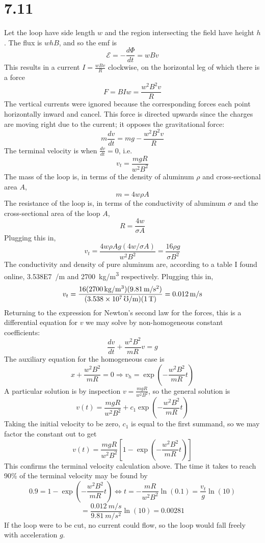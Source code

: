 \documentclass{article}
\begin{document}
\section*{7.11}
Let the loop have side length $w$ and the region intersecting the field have height $h$. The flux is $whB$, and so the emf is
\[\mathcal{E}=-\frac{d\Phi}{dt}=wBv \]
This results in a current $I=\frac{wBv}{R}$ clockwise, on the horizontal leg of which there is a force
\[F=BIw=\frac{w^2B^2v}{R} \]
The vertical currents were ignored because the corresponding forces each point horizontally inward and cancel.
This force is directed upwards since the charges are moving right due to the current; it opposes the gravitational force:
\[m\frac{dv}{dt}=mg-\frac{w^2B^2v}{R}\]
The terminal velocity is when $\frac{dv}{dt}=0$, i.e.
\[v_t=\frac{mgR}{w^2B^2}\]
The mass of the loop is, in terms of the density of aluminum $\rho$ and cross-sectional area $A$,
\[m=4w\rho A\]
The resistance of the loop is, in terms of the conductivity of aluminum $\sigma$ and the cross-sectional area of the loop $A$,
\[R=\frac{4w}{\sigma A}\]
Plugging this in,
\[v_t=\frac{4w\rho Ag\left( 4w/\sigma A \right)}{w^2B^2}=\frac{16\rho g}{\sigma B^2}\]
The conductivity and density of pure aluminum are, according to a table I found online, \SI{3.538E7}{\mho/m} and \SI{2700}{kg/m^3} respectively. Plugging this in,
\[v_t=\frac{16(\SI{2700}{kg/m^3})(\SI{9.81}{m/s^2})}{(\SI{3.538E7}{\mho/m})(\SI{1}{T})}=\SI{0.012}{m/s}\]
Returning to the expression for Newton's second law for the forces, this is a differential equation for $v$ we may solve by non-homogeneous constant coefficients:
\[\frac{dv}{dt}+\frac{w^2B^2}{mR}v=g\]
The auxiliary equation for the homogeneous case is
\[x+\frac{w^2B^2}{mR}=0\Rightarrow v_h=\exp\left( -\frac{w^2B^2}{mR}t\right)\]
A particular solution is by inspection $v=\frac{mgR}{w^2B^2}$, so the general solution is
\[v(t)=\frac{mgR}{w^2B^2}+c_1\exp\left( -\frac{w^2B^2}{mR}t\right)\]
Taking the initial velocity to be zero, $c_1$ is equal to the first summand, so we may factor the constant out to get
\[v(t)=\frac{mgR}{w^2B^2}\left[ 1-\exp\left( -\frac{w^2B^2}{mR}t \right) \right]\]
This confirms the terminal velocity calculation above.
The time it takes to reach 90\% of the terminal velocity may be found by
\[0.9=1-\exp\left( -\frac{w^2B^2}{mR}t \right) \Leftrightarrow t=-\frac{mR}{w^2B^2}\ln(0.1)=\frac{v_t}{g}\ln(10)\]
\[=\frac{\SI{0.012}{m/s}}{\SI{9.81}{m/s^2}}\ln(10)={0.00281}\]
If the loop were to be cut, no current could flow, so the loop would fall freely with acceleration $g$.
\end{document}
